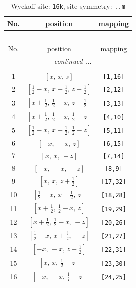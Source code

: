 \documentclass[fleqn,8pt]{jsarticle}
\begin{document}
\renewcommand{\arraystretch}{1.2}
\begin{longtable}{ccc}
\caption{Wyckoff site: {\tt 16k}, site symmetry: {\tt ..m}}
 \\
 \hline \hline
No. & position & mapping \\ \hline \endfirsthead

\multicolumn{2}{l}{\tablename\ \thetable{}} \\
 \hline \hline
No. & position & mapping \\ \hline \endhead

 \hline \hline
\multicolumn{2}{r}{\footnotesize\it continued ...} \\ \endfoot

 \hline \hline
\multicolumn{2}{r}{} \\ \endlastfoot

1 & $\left[ x,\, x,\, z \right]$ & {\tt [1,16]} \\ \hline
2 & $\left[ \frac{1}{2} - x,\, x + \frac{1}{2},\, z + \frac{1}{2} \right]$ & {\tt [2,12]} \\ \hline
3 & $\left[ x + \frac{1}{2},\, \frac{1}{2} - x,\, z + \frac{1}{2} \right]$ & {\tt [3,13]} \\ \hline
4 & $\left[ x + \frac{1}{2},\, \frac{1}{2} - x,\, \frac{1}{2} - z \right]$ & {\tt [4,10]} \\ \hline
5 & $\left[ \frac{1}{2} - x,\, x + \frac{1}{2},\, \frac{1}{2} - z \right]$ & {\tt [5,11]} \\ \hline
6 & $\left[ - x,\, - x,\, z \right]$ & {\tt [6,15]} \\ \hline
7 & $\left[ x,\, x,\, - z \right]$ & {\tt [7,14]} \\ \hline
8 & $\left[ - x,\, - x,\, - z \right]$ & {\tt [8,9]} \\ \hline
9 & $\left[ x,\, x,\, z + \frac{1}{2} \right]$ & {\tt [17,32]} \\ \hline
10 & $\left[ \frac{1}{2} - x,\, x + \frac{1}{2},\, z \right]$ & {\tt [18,28]} \\ \hline
11 & $\left[ x + \frac{1}{2},\, \frac{1}{2} - x,\, z \right]$ & {\tt [19,29]} \\ \hline
12 & $\left[ x + \frac{1}{2},\, \frac{1}{2} - x,\, - z \right]$ & {\tt [20,26]} \\ \hline
13 & $\left[ \frac{1}{2} - x,\, x + \frac{1}{2},\, - z \right]$ & {\tt [21,27]} \\ \hline
14 & $\left[ - x,\, - x,\, z + \frac{1}{2} \right]$ & {\tt [22,31]} \\ \hline
15 & $\left[ x,\, x,\, \frac{1}{2} - z \right]$ & {\tt [23,30]} \\ \hline
16 & $\left[ - x,\, - x,\, \frac{1}{2} - z \right]$ & {\tt [24,25]} \\
\end{longtable}
\end{document}
